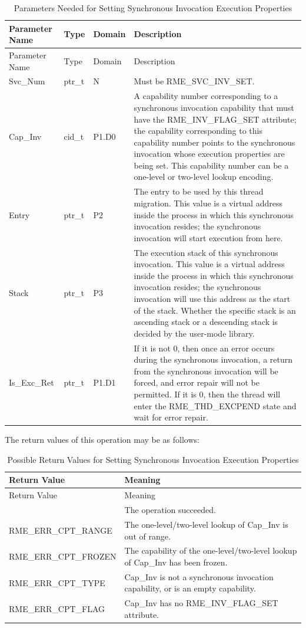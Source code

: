 \begin{xltabular}{\textwidth}{@{}>{\hsize\raggedright\arraybackslash}X>{\hsize\raggedright\arraybackslash}X>{\hsize\raggedright\arraybackslash}X>{\hsize\raggedright\arraybackslash}X@{}}
\caption{Parameters Needed for Setting Synchronous Invocation Execution Properties}\label{tab:5-8-set-sync-invocation-properties-parameters}\\
\toprule
Parameter Name & Type & Domain & Description\tabularnewline
\endfirsthead
\toprule
Parameter Name & Type & Domain & Description\tabularnewline
\midrule
\endhead
Svc\_Num & ptr\_t & N & Must be RME\_SVC\_INV\_SET.\tabularnewline
Cap\_Inv & cid\_t & P1.D0 &
A capability number corresponding to a synchronous invocation capability that must have the RME\_INV\_FLAG\_SET attribute; the capability corresponding to this capability number points to the synchronous invocation whose execution properties are being set. This capability number can be a one-level or two-level lookup encoding.\tabularnewline
Entry & ptr\_t & P2 &
The entry to be used by this thread migration. This value is a virtual address inside the process in which this synchronous invocation resides; the synchronous invocation will start execution from here.\tabularnewline
Stack & ptr\_t & P3 &
The execution stack of this synchronous invocation. This value is a virtual address inside the process in which this synchronous invocation resides; the synchronous invocation will use this address as the start of the stack. Whether the specific stack is an ascending stack or a descending stack is decided by the user-mode library.\tabularnewline
Is\_Exc\_Ret & ptr\_t & P1.D1 &
If it is not 0, then once an error occurs during the synchronous invocation, a return from the synchronous invocation will be forced, and error repair will not be permitted. If it is 0, then the thread will enter the RME\_THD\_EXCPEND state and wait for error repair.\tabularnewline
\end{xltabular}
\nopagebreak[4]

The return values of this operation may be as follows:

\begin{xltabular}{\textwidth}{@{}>{\hsize\raggedright\arraybackslash}X>{\hsize\raggedright\arraybackslash}X@{}}
\caption{Possible Return Values for Setting Synchronous Invocation Execution Properties}\label{tab:5-9-set-sync-invocation-properties-return-values}\\
\toprule
Return Value & Meaning\tabularnewline
\endfirsthead
\toprule
Return Value & Meaning\tabularnewline
\midrule
\endhead
\bottomrule
{} & The operation succeeded.\tabularnewline
    RME\_ERR\_CPT\_RANGE & The one-level/two-level lookup of Cap\_Inv is out of range.\tabularnewline
    RME\_ERR\_CPT\_FROZEN & The capability of the one-level/two-level lookup of Cap\_Inv has been frozen.\tabularnewline
    RME\_ERR\_CPT\_TYPE & Cap\_Inv is not a synchronous invocation capability, or is an empty capability.\tabularnewline
    RME\_ERR\_CPT\_FLAG & Cap\_Inv has no RME\_INV\_FLAG\_SET attribute.\tabularnewline
\end{xltabular}
\nopagebreak[4]

